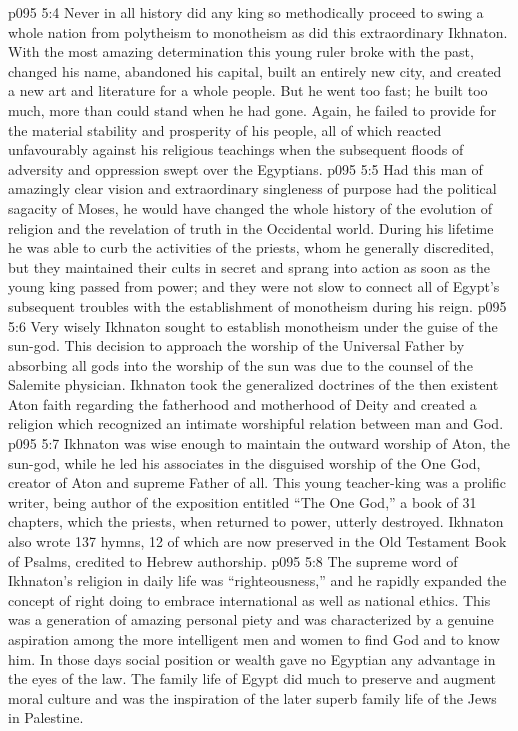 \vs p095 5:4 Never in all history did any king so methodically proceed to swing a whole nation from polytheism to monotheism as did this extraordinary Ikhnaton. With the most amazing determination this young ruler broke with the past, changed his name, abandoned his capital, built an entirely new city, and created a new art and literature for a whole people. But he went too fast; he built too much, more than could stand when he had gone. Again, he failed to provide for the material stability and prosperity of his people, all of which reacted unfavourably against his religious teachings when the subsequent floods of adversity and oppression swept over the Egyptians.
\vs p095 5:5 Had this man of amazingly clear vision and extraordinary singleness of purpose had the political sagacity of Moses, he would have changed the whole history of the evolution of religion and the revelation of truth in the Occidental world. During his lifetime he was able to curb the activities of the priests, whom he generally discredited, but they maintained their cults in secret and sprang into action as soon as the young king passed from power; and they were not slow to connect all of Egypt’s subsequent troubles with the establishment of monotheism during his reign.
\vs p095 5:6 Very wisely Ikhnaton sought to establish monotheism under the guise of the sun\hyp{}god. This decision to approach the worship of the Universal Father by absorbing all gods into the worship of the sun was due to the counsel of the Salemite physician. Ikhnaton took the generalized doctrines of the then existent Aton faith regarding the fatherhood and motherhood of Deity and created a religion which recognized an intimate worshipful relation between man and God.
\vs p095 5:7 Ikhnaton was wise enough to maintain the outward worship of Aton, the sun\hyp{}god, while he led his associates in the disguised worship of the One God, creator of Aton and supreme Father of all. This young teacher\hyp{}king was a prolific writer, being author of the exposition entitled “The One God,” a book of 31 chapters, which the priests, when returned to power, utterly destroyed. Ikhnaton also wrote 137 hymns, 12 of which are now preserved in the Old Testament Book of Psalms, credited to Hebrew authorship.
\vs p095 5:8 \pc The supreme word of Ikhnaton’s religion in daily life was “righteousness,” and he rapidly expanded the concept of right doing to embrace international as well as national ethics. This was a generation of amazing personal piety and was characterized by a genuine aspiration among the more intelligent men and women to find God and to know him. In those days social position or wealth gave no Egyptian any advantage in the eyes of the law. The family life of Egypt did much to preserve and augment moral culture and was the inspiration of the later superb family life of the Jews in Palestine.
